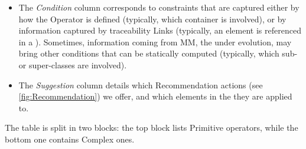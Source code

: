 \begin{itemize}
 
	\item The \textsl{Condition} column corresponds to constraints that are captured
	either by how the \textsf{Operator} is defined (typically, which \textsf{container}
	is involved), or by information captured by traceability \textsf{Link}s (typically,
	an element is referenced in a \viewtype). Sometimes, information coming from \textsf{MM},
	the \metamodel under evolution, may bring other conditions that can be statically
	computed (typically, which sub- or super-classes are involved).%
	
	\item The \textsl{Suggestion} column details which \textsf{Recommendation} actions (see \cref{fig:Recommendation}) we offer, and which elements in the \viewtype they are applied to.
\end{itemize}
The table is split in two blocks: the top block lists \textsf{Primitive} operators, while the bottom one contains \textsf{Complex} ones.

